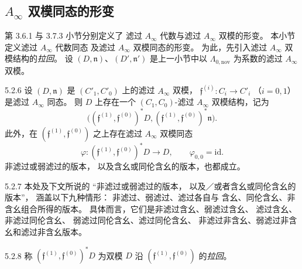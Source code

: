 
\subsection{\texorpdfstring{$A_\infty$}{A-infinity} 双模同态的形变}
\label{subsec:5-2-2}

第 3.6.1 与 3.7.3 小节分别定义了
滤过 $A_\infty$ 代数与滤过 $A_\infty$ 双模的形变。
本小节定义滤过 $A_\infty$ 代数同态
及滤过 $A_\infty$ 双模同态的形变。
为此，先引入滤过 $A_\infty$ 双模结构的\emph{拉回}。
设 $(D,\mathfrak n)$、$(D',\mathfrak n')$
是上一小节中以 $\Lambda_{0,\mathrm{nov}}$
为系数的滤过 $A_\infty$ 双模。

\begin{lemma}{5.2.6}\label{lem:5-2-6}
设 $(D,\mathfrak n)$ 是
$(C'_1,C'_0)$ 上的滤过 $A_\infty$ 双模，
$\mathfrak f^{(i)}:C_i\to C'_i$
（$i=0,1$）是滤过 $A_\infty$ 同态。
则 $D$ 上存在一个 $(C_1,C_0)$-滤过
$A_\infty$ 双模结构，记为
\[
\bigl((\mathfrak f^{(1)},\mathfrak f^{(0)})^*D,
      (\mathfrak f^{(1)},\mathfrak f^{(0)})^*\mathfrak n\bigr).
\]
此外，在 $(\mathfrak f^{(1)},\mathfrak f^{(0)})$
之上存在滤过 $A_\infty$ 双模同态
\[
\varphi:
(\mathfrak f^{(1)},\mathfrak f^{(0)})^*D
\longrightarrow D,
\qquad \varphi_{0,0}=\mathrm{id}.
\]
非滤过或弱滤过的版本，
以及含幺或同伦含幺的版本，也都成立。
\end{lemma}

\begin{remark}{5.2.7}\label{rem:5-2-7}
本处及下文所说的
“非滤过或弱滤过的版本，
以及／或者含幺或同伦含幺的版本”，
涵盖以下九种情形：
非滤过、弱滤过、滤过各自与
含幺、同伦含幺、非含幺组合所得的版本。
具体而言，它们是非滤过含幺、弱滤过含幺、
滤过含幺、非滤过同伦含幺、
弱滤过同伦含幺、滤过同伦含幺、
非滤过非含幺、弱滤过非含幺和滤过非含幺版本。
\end{remark}

\begin{definition}{5.2.8}\label{def:5-2-8}
称 $(\mathfrak f^{(1)},\mathfrak f^{(0)})^*D$
为双模 $D$ 沿
$(\mathfrak f^{(1)},\mathfrak f^{(0)})$
的\emph{拉回}。
\end{definition}


